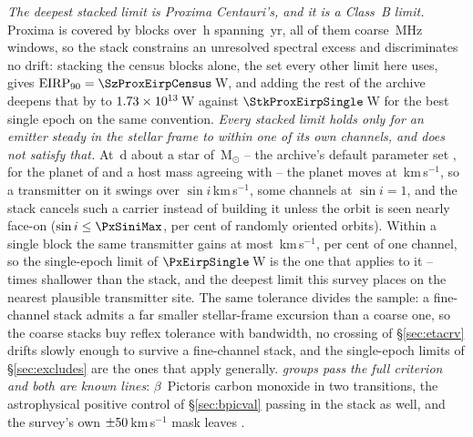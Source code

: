 \emph{The deepest stacked limit is Proxima Centauri's, and it is a Class~B
limit.} Proxima is covered by \StkProxN{} blocks over \StkProxHours\,h spanning
\StkProxSpanYr\,yr, all of them coarse \ChanBModeMHz\,MHz windows, so the stack
constrains an unresolved spectral excess and discriminates no drift: stacking
the census blocks alone, the set every other limit here uses, gives
$\mathrm{EIRP}_{90}=\SzProxEirpCensus$\,W, and adding the rest of the archive
deepens that by \SzProxDeepen{} to $1.73\times10^{13}$\,W against
$\StkProxEirpSingle$\,W for the best single epoch on the same convention.
\emph{Every stacked limit holds only for an emitter steady in the stellar frame
to within one of its own channels, and \PxPlanet{} does not satisfy that.} At
\PxPorbD\,d about a star of \PxMassMsun\,M$_\odot$ -- the archive's default
parameter set \citep{NEA2013}, for the planet of \citet{AngladaEscude2016} and a
host mass agreeing with \citet{Kervella2017} -- the planet moves at
\PxVorbKms\,km\,s$^{-1}$, so a transmitter on it swings over \PxPPKms$\sin
i$\,km\,s$^{-1}$, some \PxNChanWalk{} channels at $\sin i=1$, and the stack
cancels such a carrier instead of building it unless the orbit is seen nearly
face-on ($\sin i\le\PxSiniMax$, \PxIsoPct{} per cent of randomly oriented
orbits). Within a single block the same transmitter gains at most
\PxBlockDvKms\,km\,s$^{-1}$, \PxBlockPct{} per cent of one channel, so the
single-epoch limit of $\PxEirpSingle$\,W is the one that applies to it --
\PxEirpRatio{} times shallower than the stack, and the deepest limit this
survey places on the nearest plausible transmitter site. The same tolerance
divides the sample: a fine-channel stack admits a far smaller stellar-frame
excursion than a coarse one, so the coarse stacks buy reflex tolerance with
bandwidth, no crossing of \S\ref{sec:etacrv} drifts slowly enough to survive a
fine-channel stack, and the single-epoch limits of \S\ref{sec:excludes} are the
ones that apply generally. \emph{\StkNSurvive{} groups pass the full criterion
and both are known lines}: $\beta$~Pictoris carbon monoxide in two transitions,
the astrophysical positive control of \S\ref{sec:bpicval} passing in the stack
as well, and the survey's own $\pm50$\,km\,s$^{-1}$ mask leaves
\StkUnattrClause.

